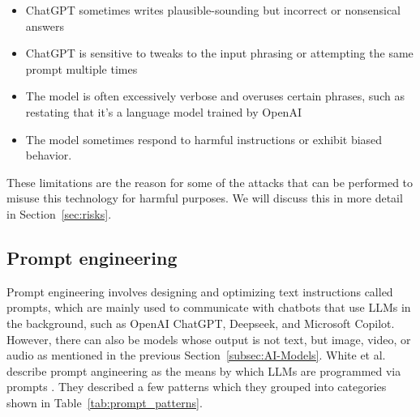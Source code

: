 \begin{itemize}
    \item ChatGPT sometimes writes plausible-sounding but incorrect or nonsensical answers
    \item ChatGPT is sensitive to tweaks to the input phrasing or attempting the same prompt multiple times
    \item The model is often excessively verbose and overuses certain phrases, such as restating that it’s a language model trained by OpenAI
    \item The model sometimes respond to harmful instructions or exhibit biased behavior.
\end{itemize}

These limitations are the reason for some of the attacks that can be performed to misuse this technology for harmful purposes. We will discuss this in more detail in Section~\ref{sec:risks}.


\subsection{Prompt engineering}
Prompt engineering involves designing and optimizing text instructions called prompts, which are mainly used to communicate with chatbots that use LLMs in the background, such as OpenAI ChatGPT, Deepseek, and Microsoft Copilot. However, there can also be models whose output is not text, but image, video, or audio as mentioned in the previous Section~\ref{subsec:AI-Models}. White et al. describe prompt angineering as the means by which LLMs are programmed via prompts \cite{white2023promptpatterncatalogenhance}. They described a few patterns which they grouped into categories shown in Table~\ref{tab:prompt_patterns}.

